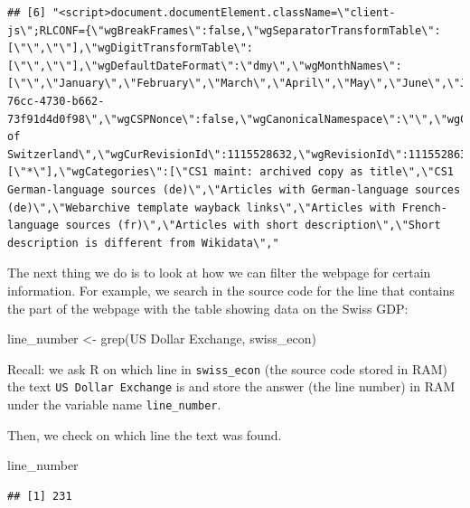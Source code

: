\documentclass[
  12pt,
]{style/krantz}
\newenvironment{Shaded}{\begin{snugshade}}{\end{snugshade}}
\newcommand{\FunctionTok}[1]{\textcolor[rgb]{0.00,0.00,0.00}{#1}}
\newcommand{\NormalTok}[1]{#1}
\newcommand{\OtherTok}[1]{\textcolor[rgb]{0.56,0.35,0.01}{#1}}
\newcommand{\StringTok}[1]{\textcolor[rgb]{0.31,0.60,0.02}{#1}}
\begin{document}
\begin{verbatim}
## [6] "<script>document.documentElement.className=\"client-js\";RLCONF={\"wgBreakFrames\":false,\"wgSeparatorTransformTable\":[\"\",\"\"],\"wgDigitTransformTable\":[\"\",\"\"],\"wgDefaultDateFormat\":\"dmy\",\"wgMonthNames\":[\"\",\"January\",\"February\",\"March\",\"April\",\"May\",\"June\",\"July\",\"August\",\"September\",\"October\",\"November\",\"December\"],\"wgRequestId\":\"42ab162f-76cc-4730-b662-73f91d4d0f98\",\"wgCSPNonce\":false,\"wgCanonicalNamespace\":\"\",\"wgCanonicalSpecialPageName\":false,\"wgNamespaceNumber\":0,\"wgPageName\":\"Economy_of_Switzerland\",\"wgTitle\":\"Economy of Switzerland\",\"wgCurRevisionId\":1115528632,\"wgRevisionId\":1115528632,\"wgArticleId\":27465,\"wgIsArticle\":true,\"wgIsRedirect\":false,\"wgAction\":\"view\",\"wgUserName\":null,\"wgUserGroups\":[\"*\"],\"wgCategories\":[\"CS1 maint: archived copy as title\",\"CS1 German-language sources (de)\",\"Articles with German-language sources (de)\",\"Webarchive template wayback links\",\"Articles with French-language sources (fr)\",\"Articles with short description\",\"Short description is different from Wikidata\","
\end{verbatim}

The next thing we do is to look at how we can filter the webpage for certain information. For example, we search in the source code for the line that contains the part of the webpage with the table showing data on the Swiss GDP:

\begin{Shaded}
\begin{Highlighting}[]
\NormalTok{line\_number }\OtherTok{\textless{}{-}} \FunctionTok{grep}\NormalTok{(}\StringTok{\textquotesingle{}US Dollar Exchange\textquotesingle{}}\NormalTok{, swiss\_econ)}
\end{Highlighting}
\end{Shaded}

Recall: we ask R on which line in \texttt{swiss\_econ} (the source code stored in RAM) the text \texttt{US\ Dollar\ Exchange} is and store the answer (the line number) in RAM under the variable name \texttt{line\_number}.

Then, we check on which line the text was found.

\begin{Shaded}
\begin{Highlighting}[]
\NormalTok{line\_number}
\end{Highlighting}
\end{Shaded}

\begin{verbatim}
## [1] 231
\end{verbatim}
\end{document}
